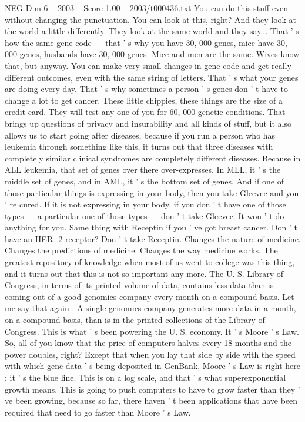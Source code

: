 \begin{textsample}{NEG Dim 6 – 2003 – Score 1.00 – 2003/t000436.txt}
You can do this stuff even without changing the punctuation.
You can look at this, right?
And they look at the world a little differently.
They look at the same world and they say...
That ' s how the same gene code — that ' s why you have 30, 000 genes, mice have 30, 000 genes, husbands have 30, 000 genes.
Mice and men are the same.
Wives know that, but anyway.
You can make very small changes in gene code and get really different outcomes, even with the same string of letters.
That ' s what your genes are doing every day.
That ' s why sometimes a person ' s genes don ' t have to change a lot to get cancer.
These little chippies, these things are the size of a credit card.
They will test any one of you for 60, 000 genetic conditions.
That brings up questions of privacy and insurability and all kinds of stuff, but it also allows us to start going after diseases, because if you run a person who has leukemia through something like this, it turns out that three diseases with completely similar clinical syndromes are completely different diseases.
Because in ALL leukemia, that set of genes over there over-expresses.
In MLL, it ' s the middle set of genes, and in AML, it ' s the bottom set of genes.
And if one of those particular things is expressing in your body, then you take Gleevec and you ' re cured.
If it is not expressing in your body, if you don ' t have one of those types — a particular one of those types — don ' t take Gleevec.
It won ' t do anything for you.
Same thing with Receptin if you ' ve got breast cancer.
Don ' t have an HER- 2 receptor?
Don ' t take Receptin.
Changes the nature of medicine.
Changes the predictions of medicine.
Changes the way medicine works.
The greatest repository of knowledge when most of us went to college was this thing, and it turns out that this is not so important any more.
The U.
S.
Library of Congress, in terms of its printed volume of data, contains less data than is coming out of a good genomics company every month on a compound basis.
Let me say that again : A single genomics company generates more data in a month, on a compound basis, than is in the printed collections of the Library of Congress.
This is what ' s been powering the U.
S. economy.
It ' s Moore ' s Law.
So, all of you know that the price of computers halves every 18 months and the power doubles, right?
Except that when you lay that side by side with the speed with which gene data ' s being deposited in GenBank, Moore ' s Law is right here : it ' s the blue line.
This is on a log scale, and that ' s what superexponential growth means.
This is going to push computers to have to grow faster than they ' ve been growing, because so far, there haven ' t been applications that have been required that need to go faster than Moore ' s Law.

\end{textsample}
